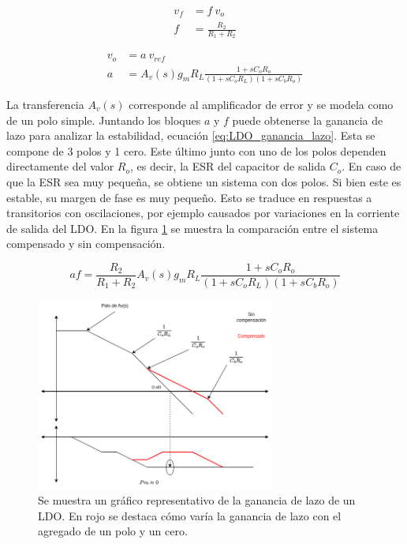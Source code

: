 \begin{subequations}
    \begin{align}
        v_f &= f \ v_o\\
        f &= \frac{R_2}{R_1 + R_2} \label{eq:LDO_bloque_f}
    \end{align}
\end{subequations}

\begin{subequations}
    \begin{align}
        v_o &= a \ v_{ref}\\
        a &= A_v(s) g_m  R_L \frac{1 + s C_o R_o}{\left( 1 + s C_o  R_L \right)  \left( 1 + s C_b R_o \right)} \label{eq:LDO_bloque_a}
    \end{align}
\end{subequations}

La transferencia $A_v(s)$ corresponde al amplificador de error y se modela como de un polo simple. Juntando los bloques $a$ y $f$ puede obtenerse la ganancia de lazo para analizar la estabilidad, ecuación \eqref{eq:LDO_ganancia_lazo}. Esta se compone de 3 polos y 1 cero. Este último junto con uno de los polos dependen directamente del valor $R_o$, es decir, la ESR del capacitor de salida $C_o$. En caso de que la ESR sea muy pequeña, se obtiene un sistema con dos polos. Si bien este es estable, su margen de fase es muy pequeño. Esto se traduce en respuestas a transitorios con oscilaciones, por ejemplo causados por variaciones en la corriente de salida del LDO. En la figura \ref{fig:LDO_ganancia_lazo_1} se muestra la comparación entre el sistema compensado y sin compensación.

\begin{equation}
    af = \frac{R_2}{R_1+R_2} A_v(s) g_m  R_L \frac{1 + s C_o R_o}{\left( 1 + s C_o R_L \right) \left( 1 + s C_b R_o \right)}
    \label{eq:LDO_ganancia_lazo}
\end{equation}

\begin{figure}[H]
    \centering
    \includegraphics[width=0.7\textwidth]{img/LDO_ganancia_lazo_1.png}
    \caption{Se muestra un gráfico representativo de la ganancia de lazo de un LDO. En rojo se destaca cómo varía la ganancia de lazo con el agregado de un polo y un cero.}
    \label{fig:LDO_ganancia_lazo_1}    
\end{figure}

